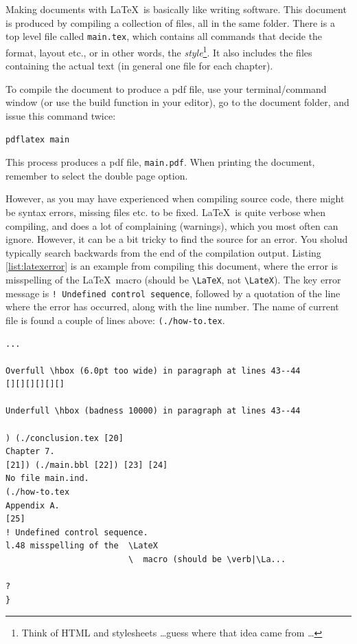 Making documents with  \LaTeX\ is basically like writing software. 
This document is produced by compiling a collection of files, all in the same folder.
There is a top level file called 
{\tt main.tex}, which contains all commands that decide the format, layout etc., or in other words, the {\em style}\footnote{Think of HTML and stylesheets \dots guess where that idea came from \dots}. It also includes the files containing the actual text (in general one file for each chapter).

To compile the document to produce a pdf file, use your terminal/command window (or use the build function in your editor), go to the document folder, and issue this command twice: 

\verb|pdflatex main|


This process produces a  pdf file,
{\tt main.pdf}. When printing the document, remember to select the double page option.

However, as you may have experienced when compiling source code, there might be syntax errors, missing files etc. to be fixed.  \LaTeX\  is quite verbose when compiling, and does a lot of complaining (warnings), which you most often can ignore. However, it can be a bit tricky to find the source for an error. You sholud typically search backwards from the end of the compilation output. Listing \ref{list:latexerror} is an example from compiling this document, where the error is 
misspelling of the \LaTeX\  macro (should be \verb|\LaTeX|, not \verb|\LateX|). The key error message is \verb|! Undefined control sequence|, followed by a quotation of the line where the error has occurred, along with the line number. The name of current file is found a couple of lines above: \verb|(./how-to.tex|.

\begin{lstlisting}[float=htpb, caption=\LaTeX\ error output,label=list:latexerror]
...

Overfull \hbox (6.0pt too wide) in paragraph at lines 43--44
[][][][][][]

Underfull \hbox (badness 10000) in paragraph at lines 43--44

) (./conclusion.tex [20]
Chapter 7.
[21]) (./main.bbl [22]) [23] [24]
No file main.ind.
(./how-to.tex
Appendix A.
[25]
! Undefined control sequence.
l.48 misspelling of the  \LateX
                         \  macro (should be \verb|\La...

? 
} 
\end{lstlisting} 

